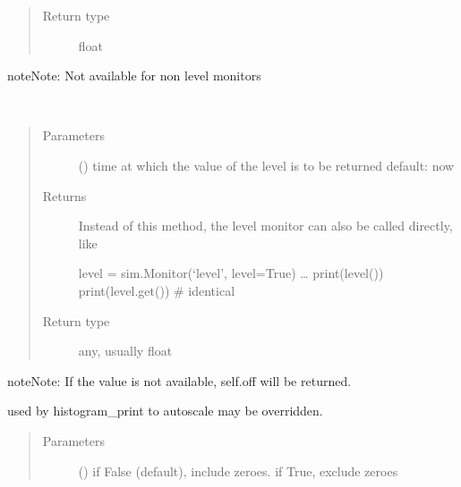 \documentclass[letterpaper,10pt,english]{sphinxmanual}
\begin{document}
\begin{fulllineitems}
\begin{fulllineitems}
\begin{quote}
\begin{description}
\item[{Return type}] \leavevmode
float

\end{description}\end{quote}

\begin{sphinxadmonition}{note}{Note:}
Not available for non level monitors
\end{sphinxadmonition}

\end{fulllineitems}


\begin{fulllineitems}
\label{\detokenize{Reference:salabim.Monitor.get}}~\begin{quote}\begin{description}
\item[{Parameters}] \leavevmode
{} () \textendash{} time at which the value of the level is to be returned 
default: now

\item[{Returns}] \leavevmode

 \textendash{} Instead of this method, the level monitor can also be called directly, like 

level = sim.Monitor(‘level’, level=True) 
… 
print(level()) 
print(level.get())  \# identical 


\item[{Return type}] \leavevmode
any, usually float

\end{description}\end{quote}

\begin{sphinxadmonition}{note}{Note:}
If the value is not available, self.off will be returned.
\end{sphinxadmonition}

\end{fulllineitems}


\begin{fulllineitems}
\label{\detokenize{Reference:salabim.Monitor.histogram_autoscale}}
used by histogram\_print to autoscale 
may be overridden.
\begin{quote}\begin{description}
\item[{Parameters}] \leavevmode
{} () \textendash{} if False (default), include zeroes. if True, exclude zeroes


\end{description}
\end{quote}
\end{fulllineitems}
\end{fulllineitems}
\end{document}
